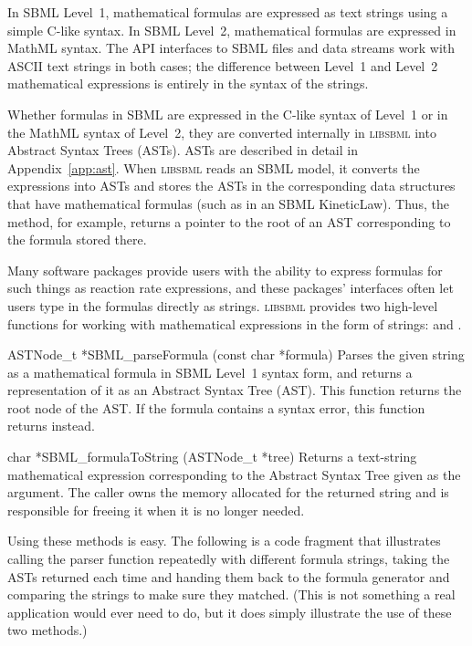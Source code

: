 \documentclass{sbmlmanual}
\newcommand{\libsbml}{\textsc{libsbml}}
\begin{document}
In SBML Level~1, mathematical formulas are expressed as text strings using
a simple C-like syntax.  In SBML Level~2, mathematical formulas are
expressed in MathML syntax.  The API interfaces to SBML files and data
streams work with ASCII text strings in both cases; the difference between
Level~1 and Level~2 mathematical expressions is entirely in the syntax of
the strings.

Whether formulas in SBML are expressed in the C-like syntax of Level~1 or
in the MathML syntax of Level~2, they are converted internally in
\libsbml{} into Abstract Syntax Trees (ASTs).  ASTs are described in detail
in Appendix~\ref{app:ast}.  When \libsbml{} reads an SBML model, it
converts the expressions into ASTs and stores the ASTs in the corresponding
data structures that have mathematical formulas (such as in an SBML
KineticLaw).  Thus, the  method, for example,
returns a pointer to the root of an AST corresponding to the formula stored
there.

Many software packages provide users with the ability to express formulas
for such things as reaction rate expressions, and these packages'
interfaces often let users type in the formulas directly as strings.
\libsbml{} provides two high-level functions for working with mathematical
expressions in the form of strings:  and
.

\begin{methoddef}{ASTNode\_t *SBML\_parseFormula (const char *formula)}
  Parses the given string as a mathematical formula in SBML Level~1 syntax
  form, and returns a representation of it as an Abstract Syntax Tree
  (AST).  This function returns the root node of the AST.  If the formula
  contains a syntax error, this function returns  instead.
\end{methoddef}

\begin{methoddef}{char *SBML\_formulaToString (ASTNode\_t *tree)}
  Returns a text-string mathematical expression corresponding to the
  Abstract Syntax Tree given as the argument.  The caller owns the memory
  allocated for the returned string and is responsible for freeing it when
  it is no longer needed.
\end{methoddef}

Using these methods is easy.  The following is a code fragment that
illustrates calling the parser function repeatedly with different formula
strings, taking the ASTs returned each time and handing them back to the
formula generator and comparing the strings to make sure they matched.
(This is not something a real application would ever need to do, but it
does simply illustrate the use of these two methods.)
\end{document}
